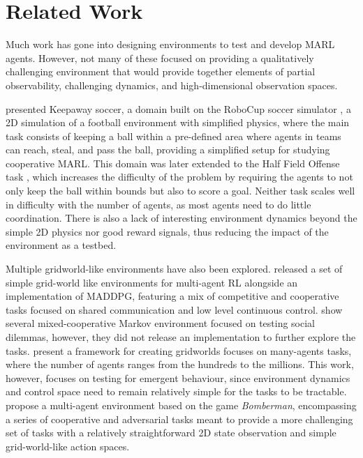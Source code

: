 \section{Related Work}

Much work has gone into designing environments to test and develop MARL agents. However, not many of these focused on providing a qualitatively
challenging environment that would provide together elements of partial
observability, challenging dynamics, and
high-dimensional observation spaces.

\citet{stone2005keepaway} presented Keepaway soccer, a domain built on the RoboCup soccer
simulator \citep{kitano1997robocup}, a 2D simulation of a football environment
with simplified physics, where the main task consists of keeping a ball within a
pre-defined area where agents in teams can reach, steal, and pass the ball,
providing a simplified setup for studying cooperative MARL.
This domain was later extended to the Half Field Offense task
\citep{kalyanakrishnan2006half, hausknecht_half_2016}, which increases the
difficulty of the problem by requiring the agents to not only keep the ball
within bounds but also to score a goal.
Neither task scales well in difficulty with the number of agents, as most
agents need to do little coordination. There is also a lack of interesting environment
dynamics beyond the simple 2D physics nor good reward signals, thus reducing the
impact of the environment as a testbed.

Multiple gridworld-like environments have also been explored.
\citet{lowe_multi-agent_2017} released a set of simple grid-world like
environments for multi-agent RL alongside an implementation of MADDPG, featuring
a mix of competitive and cooperative tasks focused on shared communication and
low level continuous control.
\citet{leibo_multi-agent_2017} show several mixed-cooperative Markov
environment focused on testing social dilemmas, however, they did not release an
implementation to further explore the tasks.
\citet{yang2018mean, zheng2017magent} present a framework for creating
gridworlds focuses on many-agents tasks, where the number of agents ranges from
the hundreds to the millions. This work, however, focuses on testing for emergent
behaviour, since environment dynamics and control space need to remain
relatively simple for the tasks to be tractable.
\citet{resnick2018pommerman} propose a multi-agent environment based on the game
\emph{Bomberman}, encompassing a series of cooperative and adversarial tasks
meant to provide a more challenging set of tasks with a relatively
straightforward 2D state observation and simple grid-world-like action spaces.

